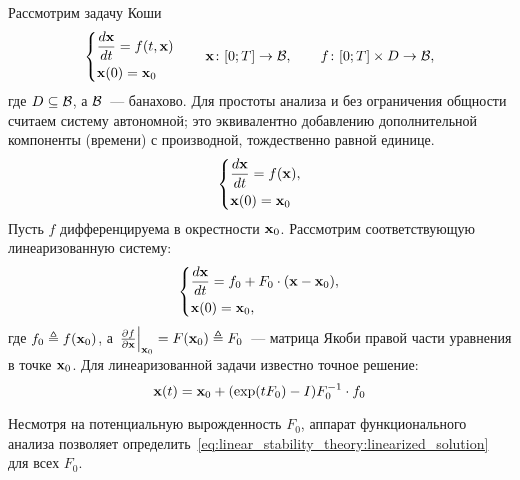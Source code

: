 Рассмотрим задачу Коши
\begin{equation}
    \label{eq:linear_stability_theory:initial_value_problem}
    \begin{dcases}
        \frac{d \mathbf{x}}{d t} = f(t, \mathbf{x}) \\
        \mathbf{x}(0) = \mathbf{x}_0
    \end{dcases}
    \qquad
    \mathbf{x} \colon [0; T] \to \mathcal{B}, \qquad f \colon [0;T] \times D \to \mathcal{B},
\end{equation}
%
где $ D \subseteq \mathcal{B} $,
а $ \mathcal{B} $~--- банахово.
Для простоты анализа и без ограничения общности считаем систему автономной;
это эквивалентно добавлению дополнительной компоненты (времени) с производной,
тождественно равной единице.
%
\begin{equation}
    \label{eq:linear_stability_theory:autonomous_initial_value_problem}
    \begin{dcases}
        \frac{d \mathbf{x}}{d t} = f(\mathbf{x}), \\
        \mathbf{x}(0) = \mathbf{x}_0
    \end{dcases}
\end{equation}
%
Пусть $ f $ дифференцируема в окрестности $ \mathbf{x}_0 $.
Рассмотрим соответствующую линеаризованную систему:
%
\begin{equation}
    \label{eq:linear_stability_theory:linearized_initial_value_problem}
    \begin{dcases}
        \frac{d \mathbf{x}}{d t} = f_0 + F_0 \cdot (\mathbf{x} - \mathbf{x}_0), \\
        \mathbf{x}(0) = \mathbf{x}_0,
    \end{dcases}
\end{equation}
%
где $ f_0 \triangleq f(\mathbf{x}_0)$,
а $ \left. \frac{\partial f}{\partial \mathbf{x}} \right|_{\mathbf{x}_0} = F(\mathbf{x}_0) \triangleq F_0 $~---
матрица Якоби правой части уравнения в точке $ \mathbf{x}_0 $.
Для линеаризованной задачи известно точное решение:
\begin{equation}
    \label{eq:linear_stability_theory:linearized_solution}
    \mathbf{x}(t) = \mathbf{x}_0 + (\exp(t F_0) - I) F_0^{-1} \cdot f_0
\end{equation}

Несмотря на потенциальную вырожденность $ F_0 $,
аппарат функционального анализа позволяет определить~\eqref{eq:linear_stability_theory:linearized_solution}
для всех $ F_0 $.

